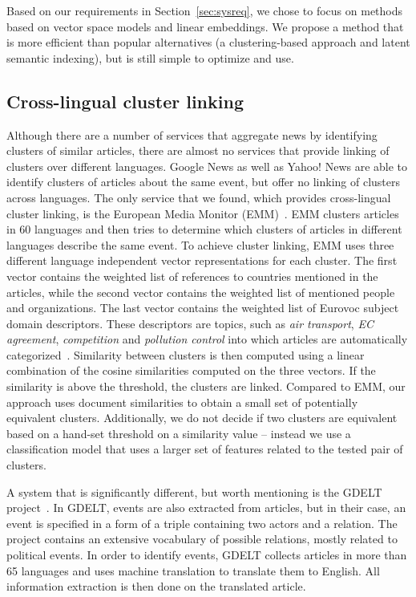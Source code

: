 \documentclass[twoside,11pt]{article}
\begin{document}
Based on our requirements in Section~\ref{sec:sysreq}, we chose to focus on methods based on vector space models and linear embeddings. We propose a method that is more efficient than popular alternatives (a clustering-based approach and latent semantic indexing), but is still simple to optimize and use.

\subsection{Cross-lingual cluster linking}

Although there are a number of services that aggregate news by identifying clusters of similar articles, there are almost no services that provide linking of clusters over different languages. Google News as well as Yahoo! News are able to identify clusters of articles about the same event, but offer no linking of clusters across languages. The only service that we found, which provides cross-lingual cluster linking, is the European Media Monitor (EMM)~\cite{pouliquen2008story,Steinberger2008}. EMM clusters articles in 60 languages and then tries to determine which clusters of articles in different languages describe the same event. To achieve cluster linking, EMM uses three different language independent vector representations for each cluster. The first vector contains the weighted list of references to countries mentioned in the articles, while the second vector contains the weighted list of mentioned people and organizations. The last vector contains the weighted list of Eurovoc subject domain descriptors. These descriptors are topics, such as \emph{air transport}, \emph{EC agreement}, \emph{competition} and \emph{pollution control} into which articles are automatically categorized~. Similarity between clusters is then computed using a linear combination of the cosine similarities computed on the three vectors. If the similarity is above the threshold, the clusters are linked. Compared to EMM, our approach uses document similarities to obtain a small set of potentially equivalent clusters. Additionally, we do not decide if two clusters are equivalent based on a hand-set threshold on a similarity value -- instead we use a classification model that uses a larger set of features related to the tested pair of clusters.

A system that is significantly different, but worth mentioning is the GDELT project~\cite{Leetaru2013Gdelt}. In GDELT, events are also extracted from articles, but in their case, an event is specified in a form of a triple containing two actors and a relation. The project contains an extensive vocabulary of possible relations, mostly related to political events. In order to identify events, GDELT collects articles in more than 65 languages and uses machine translation to translate them to English. All information extraction is then done on the translated article.
\end{document}
